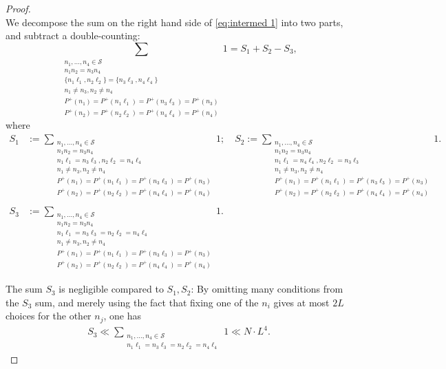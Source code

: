 \documentclass[12pt]{amsart}
\numberwithin{equation}{section}
\theoremstyle{plain}
\theoremstyle{definition}
\renewcommand{\l}{\ell}
\renewcommand{\P}{\mathbb{P}}
\newcommand{\CS}{\mathcal{S}}
\begin{document}
\begin{proof}
\begin{equation}
		\end{equation}
		We decompose the sum on the right hand side of \eqref{eq:intermed 1} into two parts, and subtract a double-counting:
		\begin{equation}\label{eq: S1 S2 decomp}
			\sum_{\substack{n_1,\dots,n_4 \in \CS \\ n_1n_2=n_3n_4 \\ \{n_1\l_1,n_2\l_2\}=\{n_3\l_3,n_4\l_4\} \\ n_1 \ne n_3,n_2 \ne n_4 \\ P^+(n_1)=P^+(n_1 \l_1)=P^+(n_3 \l_3) = P^+(n_3) \\ P^+(n_2) = P^+(n_2 \l_2) = P^+(n_4 \l_4) = P^+(n_4) }} 1 = S_1 + S_2 - S_3,
		\end{equation}
		where
		\begin{align*}
			S_1 &:= \sum_{\substack{n_1,\dots,n_4 \in \CS \\ n_1n_2=n_3n_4 \\ n_1\l_1=n_3\l_3, n_2\l_2 = n_4\l_4 \\ n_1 \ne n_3,n_2 \ne n_4 \\ P^+(n_1) = P^+(n_1 \l_1)=P^+(n_3 \l_3) = P^+(n_3) \\P^+(n_2) =  P^+(n_2 \l_2) = P^+(n_4 \l_4) = P^+(n_4)}} 1; \quad S_2 := \sum_{\substack{n_1,\dots,n_4 \in \CS \\ n_1n_2=n_3n_4 \\ n_1\l_1=n_4\l_4, n_2\l_2 = n_3\l_3 \\ n_1 \ne n_3,n_2 \ne n_4 \\ P^+(n_1) = P^+(n_1 \l_1)=P^+(n_3 \l_3) = P^+(n_3) \\P^+(n_2) =  P^+(n_2 \l_2) = P^+(n_4 \l_4) = P^+(n_4)}} 1. \\ \\
			S_3 &:= \sum_{\substack{n_1,\dots,n_4 \in \CS \\ n_1n_2=n_3n_4 \\ n_1\l_1=n_3\l_3= n_2\l_2 = n_4\l_4 \\ n_1 \ne n_3,n_2 \ne n_4 \\ P^+(n_1) = P^+(n_1 \l_1)=P^+(n_3 \l_3) = P^+(n_3) \\P^+(n_2) =  P^+(n_2 \l_2) = P^+(n_4 \l_4) = P^+(n_4)}} 1.
		\end{align*}
		
		The sum $S_3$ is negligible compared to $S_1,S_2$: By omitting many conditions from the $S_3$ sum, and merely using the fact that fixing one of the $n_i$ gives at most $2L$ choices for the other $n_j$, one has
		\begin{align}\label{eq:new S3 bound}
			S_3 \ll \sum_{\substack{n_1,\dots,n_4 \in \CS \\ n_1\l_1=n_3\l_3= n_2\l_2 = n_4\l_4}} 1 \ll N \cdot L^4.
		\end{align}
		

\end{proof}
\end{document}
